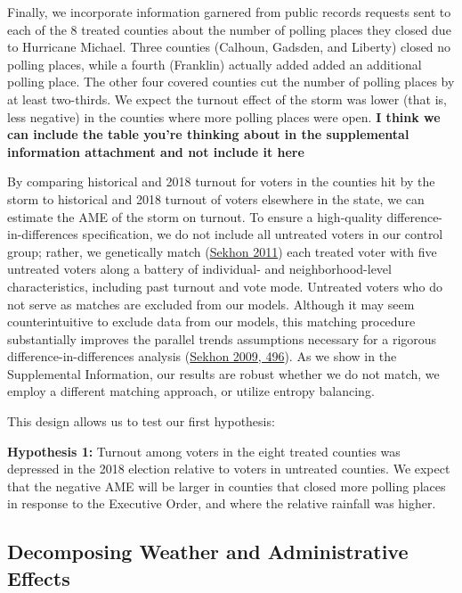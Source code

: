 \documentclass[
  12pt,
]{article}
\begin{document}
Finally, we incorporate information garnered from public records requests sent to each of the 8 treated counties about the number of polling places they closed due to Hurricane Michael. Three counties (Calhoun, Gadsden, and Liberty) closed no polling places, while a fourth (Franklin) actually added added an additional polling place. The other four covered counties cut the number of polling places by at least two-thirds. We expect the turnout effect of the storm was lower (that is, less negative) in the counties where more polling places were open. \textbf{I think we can include the table you're thinking about in the supplemental information attachment and not include it here}

By comparing historical and 2018 turnout for voters in the counties hit by the storm to historical and 2018 turnout of voters elsewhere in the state, we can estimate the AME of the storm on turnout. To ensure a high-quality difference-in-differences specification, we do not include all untreated voters in our control group; rather, we genetically match (\protect\hyperlink{ref-Sekhon2011}{Sekhon 2011}) each treated voter with five untreated voters along a battery of individual- and neighborhood-level characteristics, including past turnout and vote mode. Untreated voters who do not serve as matches are excluded from our models. Although it may seem counterintuitive to exclude data from our models, this matching procedure substantially improves the parallel trends assumptions necessary for a rigorous difference-in-differences analysis (\protect\hyperlink{ref-Sekhon2009}{Sekhon 2009, 496}). As we show in the Supplemental Information, our results are robust whether we do not match, we employ a different matching approach, or utilize entropy balancing.

This design allows us to test our first hypothesis:

\textbf{Hypothesis 1:} Turnout among voters in the eight treated counties was depressed in the 2018 election relative to voters in untreated counties. We expect that the negative AME will be larger in counties that closed more polling places in response to the Executive Order, and where the relative rainfall was higher.

\hypertarget{decomposing-weather-and-administrative-effects}{%
\subsection*{Decomposing Weather and Administrative Effects}\label{decomposing-weather-and-administrative-effects}}
\end{document}
